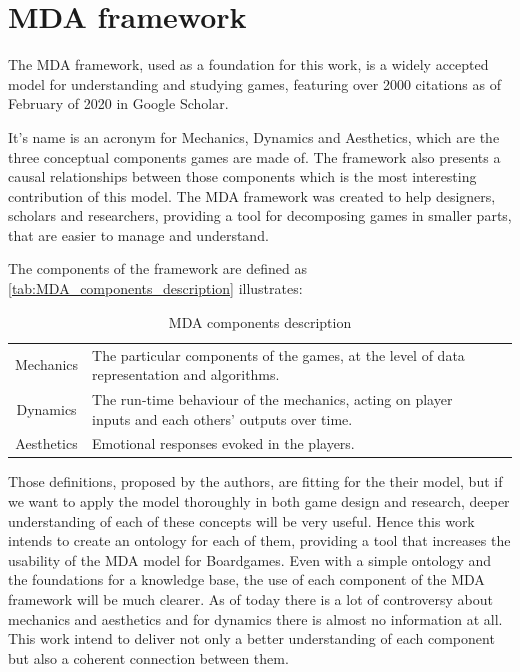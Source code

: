 \section{MDA framework}

The MDA framework, used as a foundation for this work, is a widely accepted model for understanding and studying games, featuring over 2000 citations as of February of 2020 in Google Scholar. 

It's name is an acronym for Mechanics, Dynamics and Aesthetics, which are the three conceptual components games are made of. The framework also presents a causal relationships between those components which is the most interesting contribution of this model. The MDA framework was created to help designers, scholars and researchers, providing a tool for decomposing games in smaller parts, that are easier to manage and understand. 

The components of the framework are defined as \autoref{tab:MDA_components_description} illustrates:
{\renewcommand{\arraystretch}{1.5}
\begin{table}[!h]
    \caption{MDA components description \citep{Hunicke2004}}
    \vspace{.5em}
    \centering
    \begin{tabular}{c|m{6cm}l|}
    Mechanics &  The particular components of the games, at the level of data representation and algorithms.\\ \cline{1-2}
    Dynamics & The run-time behaviour of the mechanics, acting on player inputs and each others' outputs over time.\\ \cline{1-2} 
    Aesthetics & Emotional responses evoked in the players.\\
    \end{tabular}
    \label{tab:MDA_components_description}
\end{table}}


Those definitions, proposed by the authors, are fitting for the their model, but if we want to apply the model thoroughly in both game design and research, deeper understanding of each of these concepts will be very useful. Hence this work intends to create an ontology for each of them, providing a tool that increases the usability of the MDA model for Boardgames. Even with a simple ontology and the foundations for a knowledge base, the use of each component of the MDA framework will be much clearer. As of today there is a lot of controversy about mechanics and aesthetics and for dynamics there is almost no information at all. This work intend to deliver not only a better  understanding of each component but also a coherent connection between them. 

